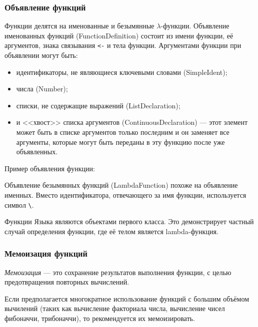         \subsubsection{Объявление функций}
            Функции делятся на именованные и безымянные $\lambda$-функции.
            Объявление именованных функций (FunctionDefinition) состоит из имени функции, её аргументов, знака связывания \verb$<-$ и тела функции.
            Аргументами функции при объявлении могут быть:
            \begin{itemize}
                \item идентификаторы, не являющиеся ключевыми словами (SimpleIdent);
                \item числа (Number);
                \item списки, не содержащие выражений (ListDeclaration);
                \item и <<хвост>> списка аргументов (ContinuousDeclaration) --- этот элемент может быть в списке аргументов только последним и он заменяет все аргументы, которые могут быть переданы в эту функцию после уже объявленных.
            \end{itemize}
            
            

            Пример объявления функции:
            

            Объявление безымянных функций (LambdaFunction) похоже на объявление именных.
            Вместо идентификатора, отвечающего за имя функции, используется символ \verb,\,.

            

            Функции Языка являются объектами первого класса.
            Это демонстрирует частный случай определения функции, где её телом является lambda-функция.

        \subsubsection{Мемоизация функций}
            \textit{Мемоизация} --- это сохранение результатов выполнения функции, с целью предотвращения повторных вычислений.

            Если предполагается многократное использование функций с большим объёмом вычилений (таких как вычисление факториала числа, вычисление чисел фибоначчи, трибоначчи), то рекомендуется их мемоизировать.

